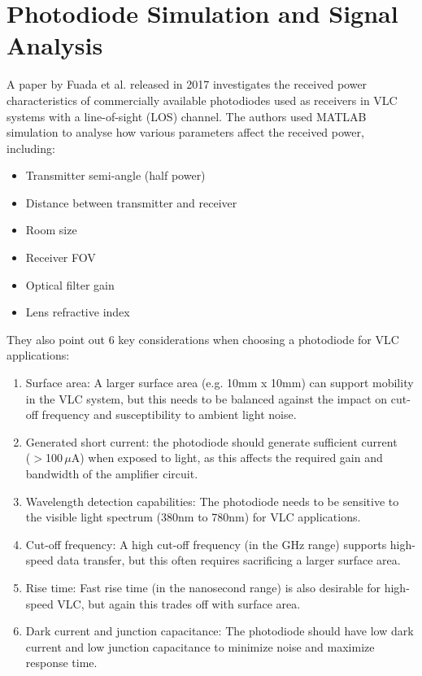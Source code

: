 \section{Photodiode Simulation and Signal Analysis}
A paper by Fuada et al. released in 2017 investigates the received power characteristics of commercially available photodiodes used as receivers in \ac{VLC} systems with a line-of-sight (LOS) channel. 
The authors used MATLAB simulation to analyse how various parameters affect the received power, including:
\begin{itemize}
\item Transmitter semi-angle (half power)
\item Distance between transmitter and receiver
\item Room size
\item Receiver \acf{FOV}
\item Optical filter gain
\item Lens refractive index
\end{itemize}

They also point out 6 key considerations when choosing a photodiode for \ac{VLC} applications:
\begin{enumerate}
\item Surface area: A larger surface area (e.g. 10mm x 10mm) can support mobility in the VLC system, but this needs to be balanced against the impact on cut-off frequency and susceptibility to ambient light noise.
\item Generated short current: the photodiode should generate sufficient current\\ ($>$100\,$\mu$A) when exposed to light, as this affects the required gain and bandwidth of the amplifier circuit.

\item Wavelength detection capabilities: The photodiode needs to be sensitive to the visible light spectrum (380nm to 780nm) for VLC applications.

\item Cut-off frequency: A high cut-off frequency (in the GHz range) supports high-speed data transfer, but this often requires sacrificing a larger surface area.

\item Rise time: Fast rise time (in the nanosecond range) is also desirable for high-speed VLC, but again this trades off with surface area.

\item Dark current and junction capacitance: The photodiode should have low dark current and low junction capacitance to minimize noise and maximize response time.
\end{enumerate}

